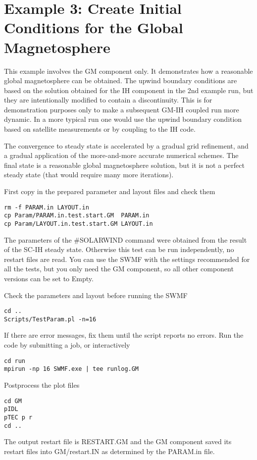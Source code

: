 \section{Example 3: Create Initial Conditions for the Global Magnetosphere}

This example involves the GM component only. It demonstrates
how a reasonable global magnetosphere can be obtained.
The upwind boundary conditions are based on the solution obtained
for the IH component in the 2nd example run, but they
are intentionally modified to contain a discontinuity.
This is for demonstration purposes only to make a subsequent
GM-IH coupled run more dynamic. In a more typical run one would
use the upwind boundary condition based on satellite measurements 
or by coupling to the IH code.

The convergence to steady state is accelerated by 
a gradual grid refinement, and a gradual application of the
more-and-more accurate numerical schemes. The final state
is a reasonable global magnetosphere solution, but it is not 
a perfect steady state (that would require many more iterations).

First copy in the prepared parameter and layout files and check them
\begin{verbatim}
rm -f PARAM.in LAYOUT.in
cp Param/PARAM.in.test.start.GM  PARAM.in
cp Param/LAYOUT.in.test.start.GM LAYOUT.in
\end{verbatim}
The parameters of the \#SOLARWIND command were obtained
from the result of the SC-IH steady state. 
Otherwise this test can be run independently, 
no restart files are read.
You can use the SWMF with the settings recommended for all the tests, 
but you only need the GM component, so all other component versions 
can be set to Empty.

Check the parameters and layout before running the SWMF
\begin{verbatim}
cd ..
Scripts/TestParam.pl -n=16
\end{verbatim}
If there are error messages, fix them until the script reports no errors.
Run the code by submitting a job, or interactively
\begin{verbatim}
cd run
mpirun -np 16 SWMF.exe | tee runlog.GM
\end{verbatim}
Postprocess the plot files
\begin{verbatim}
cd GM
pIDL
pTEC p r
cd ..
\end{verbatim}
The output restart file is RESTART.GM and the GM component saved
its restart files into GM/restart.IN as determined by the PARAM.in file.


